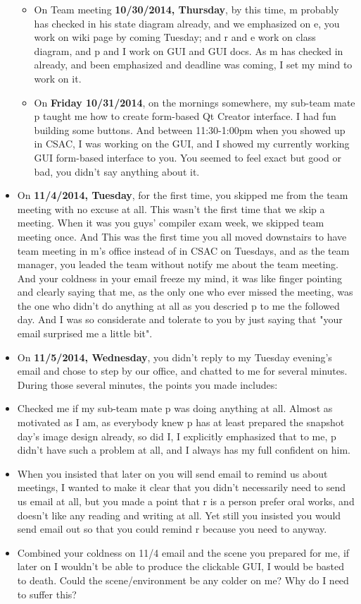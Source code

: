 \documentclass[12pt]{book}
\begin{document}
\begin{itemize}
\begin{itemize}
\item On Team meeting \textbf{10/30/2014, Thursday}, by this time, m probably has checked in his state diagram already, and we emphasized on e, you work on wiki page by coming Tuesday; and r and e work on class diagram, and p and I work on GUI and GUI docs. As m has checked in already, and been emphasized and deadline was coming, I set my mind to work on it.

\item On \textbf{Friday 10/31/2014}, on the mornings somewhere, my sub-team mate p taught me how to create form-based Qt Creator interface. I had fun building some buttons. And between 11:30-1:00pm when you showed up in CSAC, I was working on the GUI, and I showed my currently working GUI form-based interface to you. You seemed to feel exact but good or bad, you didn't say anything about it.
\end{itemize}

\item On \textbf{11/4/2014, Tuesday}, for the first time, you skipped me from the team meeting with no excuse at all. This wasn't the first time that we skip a meeting. When it was you guys' compiler exam week, we skipped team meeting once. And This was the first time you all moved downstairs to have team meeting in m's office instead of in CSAC on Tuesdays, and as the team manager, you leaded the team without notify me about the team meeting. And your coldness in your email freeze my mind, it was like finger pointing and clearly saying that me, as the only one who ever missed the meeting, was the one who didn't do anything at all as you descried p to me the followed day. And I was so considerate and tolerate to you by just saying that "your email surprised me a little bit".

\item On \textbf{11/5/2014, Wednesday}, you didn't reply to my Tuesday evening's email and chose to step by our office, and chatted to me for several minutes. During those several minutes, the points you made includes:
\item Checked me if my sub-team mate p was doing anything at all. Almost as motivated as I am, as everybody knew p has at least prepared the snapshot day's image design already, so did I, I explicitly emphasized that to me, p didn't have such a problem at all, and I always has my full confident on him.
\item When you insisted that later on you will send email to remind us about meetings, I wanted to make it clear that you didn't necessarily need to send us email at all, but you made a point that r is a person prefer oral works, and doesn't like any reading and writing at all. Yet still you insisted you would send email out so that you could remind r because you need to anyway.
\item Combined your coldness on 11/4 email and the scene you prepared for me, if later on I wouldn't be able to produce the clickable GUI, I would be basted to death. Could the scene/environment be any colder on me? Why do I need to suffer this?


\end{itemize}
\end{document}

